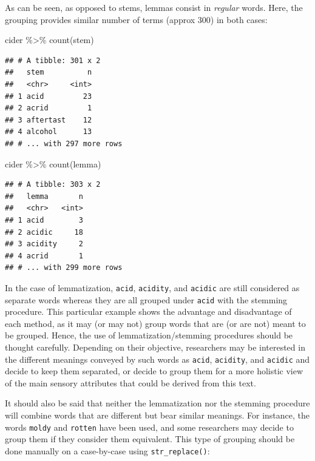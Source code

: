 \documentclass[
]{krantz}
\makeatletter
\newenvironment{Shaded}{\begin{snugshade}}{\end{snugshade}}
\newcommand{\FunctionTok}[1]{\textcolor[rgb]{0,0,0}{#1}}
\newcommand{\NormalTok}[1]{#1}
\newcommand{\SpecialCharTok}[1]{\textcolor[rgb]{0,0,0}{#1}}
\newenvironment{kframe}{%
\medskip{}
\setlength{\fboxsep}{.8em}
 \def\at@end@of@kframe{}%
 \ifinner\ifhmode%
  \def\at@end@of@kframe{\end{minipage}}%
  \begin{minipage}{\columnwidth}%
 \fi\fi%
 \def\FrameCommand##1{\hskip\@totalleftmargin \hskip-\fboxsep
 \colorbox{shadecolor}{##1}\hskip-\fboxsep
     \hskip-\linewidth \hskip-\@totalleftmargin \hskip\columnwidth}%
 \MakeFramed {\advance\hsize-\width
   \@totalleftmargin\z@ \linewidth\hsize
   \@setminipage}}%
 {\par\unskip\endMakeFramed%
 \at@end@of@kframe}
\renewenvironment{Shaded}{\begin{kframe}}{\end{kframe}}
\makeatother
\begin{document}
As can be seen, as opposed to stems, lemmas consist in \emph{regular} words. Here, the grouping provides similar number of terms (approx 300) in both cases:

\begin{Shaded}
\begin{Highlighting}[]
\NormalTok{cider }\SpecialCharTok{\%\textgreater{}\%} \FunctionTok{count}\NormalTok{(stem)}
\end{Highlighting}
\end{Shaded}

\begin{verbatim}
## # A tibble: 301 x 2
##   stem          n
##   <chr>     <int>
## 1 acid         23
## 2 acrid         1
## 3 aftertast    12
## 4 alcohol      13
## # ... with 297 more rows
\end{verbatim}

\begin{Shaded}
\begin{Highlighting}[]
\NormalTok{cider }\SpecialCharTok{\%\textgreater{}\%} \FunctionTok{count}\NormalTok{(lemma)}
\end{Highlighting}
\end{Shaded}

\begin{verbatim}
## # A tibble: 303 x 2
##   lemma       n
##   <chr>   <int>
## 1 acid        3
## 2 acidic     18
## 3 acidity     2
## 4 acrid       1
## # ... with 299 more rows
\end{verbatim}

In the case of lemmatization, \texttt{acid}, \texttt{acidity}, and \texttt{acidic} are still considered as separate words whereas they are all grouped under \texttt{acid} with the stemming procedure. This particular example shows the advantage and disadvantage of each method, as it may (or may not) group words that are (or are not) meant to be grouped. Hence, the use of lemmatization/stemming procedures should be thought carefully. Depending on their objective, researchers may be interested in the different meanings conveyed by such words as \texttt{acid}, \texttt{acidity}, and \texttt{acidic} and decide to keep them separated, or decide to group them for a more holistic view of the main sensory attributes that could be derived from this text.

It should also be said that neither the lemmatization nor the stemming procedure will combine words that are different but bear similar meanings. For instance, the words \texttt{moldy} and \texttt{rotten} have been used, and some researchers may decide to group them if they consider them equivalent. This type of grouping should be done manually on a case-by-case using \texttt{str\_replace()}:
\end{document}
